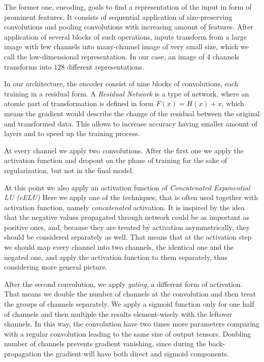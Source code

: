 The former one, encoding, goals to find a representation of the input in form of prominent features.
It consists of sequential application of size-preserving convolutions and pooling convolutions with increasing amount of features. 
After application of several blocks of such operations, inputs transform from a large image with few channels into many-channel image of very small size, which we call the low-dimensional representation. 
In our case, an image of $4$ channels transforms into $128$ different representations. 
\medskip

In our architecture, the encoder consist of nine blocks of convolutions, 
each training in a residual form.
A \textit{Residual Network} is a type of network, where an atomic part of transformation is defined in form $F(x) = H(x) + x $, which means the gradient would describe the change of the residual between the original and transformed data\cite{bibl:resnet}.
This allows to increase accuracy having smaller amount of layers and to speed up the training process.
\medskip

At every channel we apply two convolutions.
After the first one we apply the activation function and dropout on the phase of training for the sake of regularization, but not in the final model.
\medskip

At this point we also apply an activation function of \textit{Concatenated Exponential LU (cELU)}
Here we apply one of the techniques, that is often used together with activation function, namely \textit{concatenated} activation.
It is inspired by the idea that the negative values propagated through network could be as important as positive ones, and, because they are treated by activation asymmetrically, they should be considered separately as well\cite{bibl:concat_rectif}.
That means that at the activation step we should map every channel into two channels, the identical one and the negated one, and apply the activation function to them separately, thus considering more general picture.
\medskip

After the second convolution, we apply \textit{gating}, a different form of activation.
That means we double the number of channels at the convolution and then treat the groups of channels separately.
We apply a sigmoid function only for one half of channels and then multiple the results element-wisely with the leftover channels.
In this way, the convolution have two times more parameters comparing with a regular convolution leading to the same size of output tensors.
Doubling number of channels prevents gradient vanishing, since during the back-propagation the gradient will have both direct and sigmoid components\cite{bibl:conv_gating}.
\medskip


